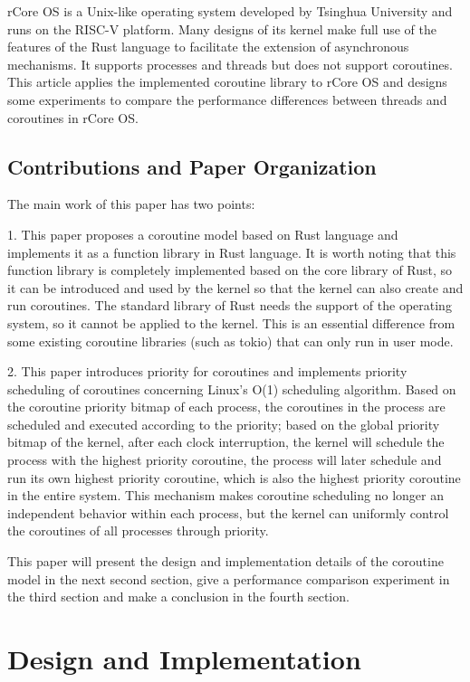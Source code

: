 \documentclass[10pt]{article}
\begin{document}
rCore OS is a Unix-like operating system developed by Tsinghua University and runs on the RISC-V platform. Many designs of its kernel make full use of the features of the Rust language to facilitate the extension of asynchronous mechanisms. It supports processes and threads but does not support coroutines. This article applies the implemented coroutine library to rCore OS and designs some experiments to compare the performance differences between threads and coroutines in rCore OS.


\subsection{Contributions and Paper Organization}

The main work of this paper has two points:

1. This paper proposes a coroutine model based on Rust language and implements it as a function library in Rust language. It is worth noting that this function library is completely implemented based on the core library of Rust, so it can be introduced and used by the kernel so that the kernel can also create and run coroutines. The standard library of Rust needs the support of the operating system, so it cannot be applied to the kernel. This is an essential difference from some existing coroutine libraries (such as tokio) that can only run in user mode.

2. This paper introduces priority for coroutines and implements priority scheduling of coroutines concerning Linux's O(1) scheduling algorithm. Based on the coroutine priority bitmap of each process, the coroutines in the process are scheduled and executed according to the priority; based on the global priority bitmap of the kernel, after each clock interruption, the kernel will schedule the process with the highest priority coroutine, the process will later schedule and run its own highest priority coroutine, which is also the highest priority coroutine in the entire system. This mechanism makes coroutine scheduling no longer an independent behavior within each process, but the kernel can uniformly control the coroutines of all processes through priority.

This paper will present the design and implementation details of the coroutine model in the next second section, give a performance comparison experiment in the third section and make a conclusion in the fourth section.

\section{Design and Implementation}
\end{document}
